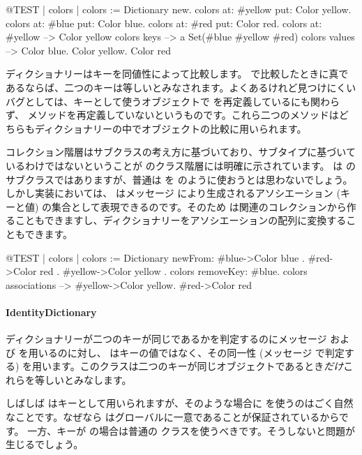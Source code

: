 \documentclass[a4paper,10pt,twoside]{book}
\begin{document}
\begin{code}{@TEST | colors |}
colors := Dictionary new.
colors at: #yellow put: Color yellow.
colors at: #blue put: Color blue.
colors at: #red put: Color red.
colors at: #yellow --> Color yellow
colors keys          --> a Set(#blue #yellow #red)
colors values       --> {Color blue. Color yellow. Color red}
\end{code}

ディクショナリーはキーを同値性によって比較します。 \ct{=} で比較したときに真であるならば、二つのキーは等しいとみなされます。よくあるけれど見つけにくいバグとしては、キーとして使うオブジェクトで \ct{=} を再定義しているにも関わらず、 メソッドを再定義していないというものです。これら二つのメソッドはどちらもディクショナリーの中でオブジェクトの比較に用いられます。

コレクション階層はサブクラスの考え方に基づいており、サブタイプに基づいているわけではないということが  のクラス階層には明確に示されています。 は  のサブクラスではありますが、普通は  を  のように使おうとは思わないでしょう。しかし実装においては、 はメッセージ  により生成されるアソシエーション (キーと値) の集合として表現できるのです。そのため  は関連のコレクションから作ることもできますし、ディクショナリーをアソシエーションの配列に変換することもできます。

\begin{code}{@TEST | colors |}
colors := Dictionary newFrom: { #blue->Color blue . #red->Color red . #yellow->Color yellow }.
colors removeKey: #blue.
colors associations --> {#yellow->Color yellow. #red->Color red}
\end{code}

\paragraph{IdentityDictionary}
ディクショナリーが二つのキーが同じであるかを判定するのにメッセージ \ct{=} および  を用いるのに対し、 はキーの値ではなく、その同一性 (メッセージ  で判定する) を用います。\ie このクラスは二つのキーが同じオブジェクトであるとき\emph{だけ}これらを等しいとみなします。

しばしば  はキーとして用いられますが、そのような場合に を使うのはごく自然なことです。なぜなら  はグローバルに一意であることが保証されているからです。
一方、キーが  の場合は普通の  クラスを使うべきです。そうしないと問題が生じるでしょう。
\end{document}
